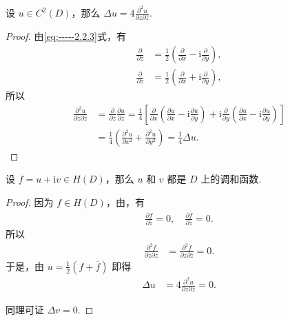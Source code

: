 \documentclass[../../main.tex]{subfiles}
\begin{document}
\begin{proposition}
设 $u \in C^2(D)$，那么 $\Delta u = 4 \frac{\partial^2 u}{\partial z \partial \overline{z}}$.
\end{proposition}
\begin{proof}
由\eqref{eq:-----2.2.3}式，有
\begin{align*}
\frac{\partial}{\partial z} &= \frac{1}{2}\left( \frac{\partial}{\partial x} - \text{i}\frac{\partial}{\partial y} \right), \\
\frac{\partial}{\partial \overline{z}} &= \frac{1}{2}\left( \frac{\partial}{\partial x} + \text{i}\frac{\partial}{\partial y} \right),
\end{align*}
所以
\begin{align*}
\frac{\partial^2 u}{\partial z \partial \overline{z}} &= \frac{\partial}{\partial \overline{z}} \frac{\partial u}{\partial z} = \frac{1}{4} \left[ \frac{\partial}{\partial x} \left( \frac{\partial u}{\partial x} - \mathrm{i} \frac{\partial u}{\partial y} \right) + \mathrm{i} \frac{\partial}{\partial y} \left( \frac{\partial u}{\partial x} - \mathrm{i} \frac{\partial u}{\partial y} \right) \right] \\
&= \frac{1}{4} \left( \frac{\partial^2 u}{\partial x^2} + \frac{\partial^2 u}{\partial y^2} \right) = \frac{1}{4} \Delta u.
\end{align*}
\end{proof}

\begin{theorem}\label{theorem:全纯函数的实部和虚部都是调和函数}
设 $f = u + \mathrm{i}v \in H(D)$，那么 $u$ 和 $v$ 都是 $D$ 上的调和函数.
\end{theorem}
\begin{proof}
因为 $f \in H(D)$，由，有
\begin{align*}
\frac{\partial f}{\partial \overline{z}} = 0, \quad
\frac{\partial \overline{f}}{\partial z} = 0.
\end{align*}
所以
\begin{align*}
\frac{\partial^2 f}{\partial z \partial \overline{z}} &= \frac{\partial^2 \overline{f}}{\partial z \partial \overline{z}} = 0.
\end{align*}
于是，由 $u = \frac{1}{2}(f + \overline{f})$ 即得
\begin{align*}
\Delta u &= 4 \frac{\partial^2 u}{\partial z \partial \overline{z}} = 0.
\end{align*}

同理可证 $\Delta v = 0$.
\end{proof}
\end{document}
